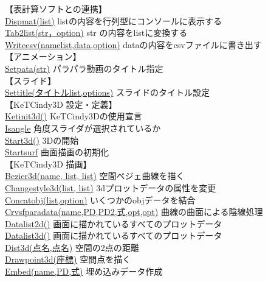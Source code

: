 \documentclass[papersize,a4paper,12pt,uplatex]{jsarticle}
\begin{document}
\begin{tabbing}
\vspace{\baselineskip}
【表計算ソフトとの連携】\\
\hyperlink{dispmat}{Dispmat(list)}  \>listの内容を行列型にコンソールに表示する\\
\hyperlink{tab2list}{Tab2list(str，option)}  \>str の内容をlistに変換する\\
\hyperlink{writecsv}{Writecsv(namelist,data,option)}  \>dataの内容をcsvファイルに書き出す\\
\vspace{\baselineskip}
【アニメーション】\\
\hyperlink{setpara}{Setpata(str)}  \>パラパラ動画のタイトル指定\\
【スライド】\\
\hyperlink{settitle}{Settitle(タイトルlist,options)}  \>スライドのタイトル設定\\
【KeTCindy3D  設定・定義】\\
\hyperlink{ketinit3d}{Ketinit3d()}  \>KeTCindy3Dの使用宣言\\
\hyperlink{isangle}{Isangle}  \>角度スライダが選択されているか\\
\hyperlink{start3d}{Start3d()}  \>3Dの開始\\
\hyperlink{startsurf}{Startsurf}  \>曲面描画の初期化\\
\vspace{\baselineskip}
【KeTCindy3D  描画】\\
\hyperlink{bezier3d}{Bezier3d(name, list, list)}  \>空間ベジェ曲線を描く\\
\hyperlink{changestyle3d}{Changestyle3d(list, list)}  \>3dプロットデータの属性を変更\\
\hyperlink{concatobj}{Concatobj(list,option)}  \>いくつかのobjデータを結合\\
\hyperlink{crvsfparadata}{Crvsfparadata(name,PD,PD2,式,opt,opt)}  \>曲線の曲面による陰線処理\\
\hyperlink{datalist}{Datalist2d()}  \>画面に描かれているすべてのプロットデータ\\
\hyperlink{datalist}{Datalist3d()}  \>画面に描かれているすべてのプロットデータ\\
\hyperlink{dist3d}{Dist3d(点名,点名)}  \>空間の2点の距離\\
\hyperlink{drawpoint3d}{Drawpoint3d(座標)}  \>空間点を描く\\
\hyperlink{embed}{Embed(name,PD,式)}  \>埋め込みデータ作成\\

\end{tabbing}
\end{document}
